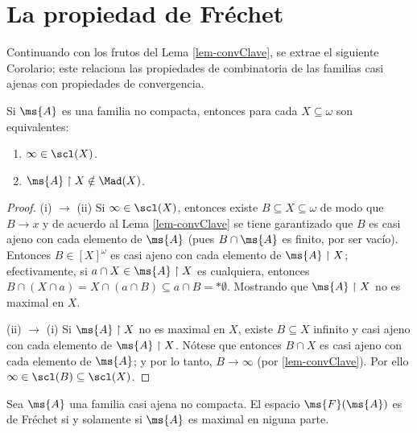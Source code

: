 	\section{La propiedad de Fréchet}

	Continuando con los frutos del Lema \ref{lem-convClave}, se extrae el siguiente Corolario; este relaciona las propiedades de combinatoria de las familias casi ajenas con propiedades de convergencia.

	\begin{proposicion}
		Si $\ms{A}$ es una familia no compacta, entonces para cada $X \subseteq \omega$ son equivalentes:
		\begin{enumerate}
			\item $\infty \in \scl(X)$.
			\item $\ms{A} \upharpoonright X \notin \Mad(X)$.
		\end{enumerate}
	\end{proposicion}

	\begin{proof} 
		(i) $\to$ (ii) Si $\infty \in \scl(X)$, entonces existe $B \subseteq X \subseteq \omega$ de modo que $B \to x$ y de acuerdo al Lema \ref{lem-convClave} se tiene garantizado que $B$ es casi ajeno con cada elemento de $\ms{A}$ (pues $B \cap \ms{A}$ es finito, por ser vacío). Entonces $B \in [X]^\omega$ es casi ajeno con cada elemento de $\ms{A} \upharpoonright X$; efectivamente, si $a \cap X \in \ms{A} \upharpoonright X$ es cualquiera, entonces $B \cap (X \cap a) = X \cap (a \cap B) \subseteq a \cap B =* \emptyset$. Mostrando que $\ms{A} \upharpoonright X$ no es maximal en $X$.

		(ii) $\to$ (i) Si $\ms{A} \upharpoonright X$ no es maximal en $X$, existe $B \subseteq X$ infinito y casi ajeno con cada elemento de $\ms{A} \upharpoonright X$. Nótese que entonces $B \cap X$ es casi ajeno con cada elemento de $\ms{A}$; y por lo tanto, $B \to \infty$ (por \ref{lem-convClave}). Por ello $\infty \in \scl(B) \subseteq \scl(X)$.
	\end{proof}

	\begin{corolario}\label{cor-TraFrechet}
		Sea $\ms{A}$ una familia casi ajena no compacta. El espacio $\ms{F}(\ms{A})$ es de Fréchet si y solamente si $\ms{A}$ es maximal en niguna parte.
	\end{corolario}

